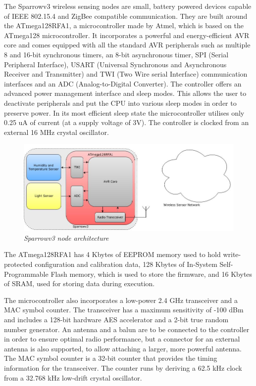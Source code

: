 The Sparrowv3 wireless sensing nodes are small, battery powered devices capable
of IEEE 802.15.4 and ZigBee compatible communication. They are built around the
\mbox{ATmega128RFA1}, a microcontroller made by Atmel, which is based on the
\mbox{ATmega128} microcontroller. It incorporates a powerful and energy-efficient AVR core and
comes equipped with all the standard AVR peripherals such as multiple 8 and
16-bit synchronous timers, an 8-bit asynchronous timer, SPI (Serial Peripheral
Interface), USART (Universal Synchronous and Asynchronous Receiver and
Transmitter) and TWI (Two Wire serial Interface) communication interfaces and
an ADC (Analog-to-Digital Converter). The controller offers an advanced power
management interface and sleep modes. This allows the user to deactivate
peripherals and put the CPU into various sleep modes in order to preserve
power. In its most efficient sleep state the microcontroller utilises only 0.25
uA of current (at a supply voltage of 3V). The controller is clocked from an
external 16 MHz crystal oscillator.

\begin{figure}[ht]
	\begin{center}
		\includegraphics[width=\textwidth]{img/sparrowv3_node.jpg}
	\end{center}
	\caption{\small \itshape{Sparrowv3 node architecture}}
\end{figure}

The \mbox{ATmega128RFA1} has 4 Kbytes of EEPROM memory used to hold
write-protected configuration and calibration data, 128 Kbytes of In-System
Self-Programmable Flash memory, which is used to store the firmware, and 16
Kbytes of SRAM, used for storing data during execution.

The microcontroller also incorporates a low-power 2.4 GHz transceiver and a MAC
symbol counter. The transceiver has a maximum sensitivity of -100 dBm and
includes a 128-bit hardware AES accelerator and a 2-bit true random number
generator. An antenna and a balun are to be connected to the controller in order
to ensure optimal radio performance, but a connector for an external antenna is
also supported, to allow attaching a larger, more powerful antenna. The MAC
symbol counter is a 32-bit counter that provides the timing information for the
transceiver. The counter runs by deriving a 62.5 kHz clock from a 32.768 kHz
low-drift crystal oscillator. 

